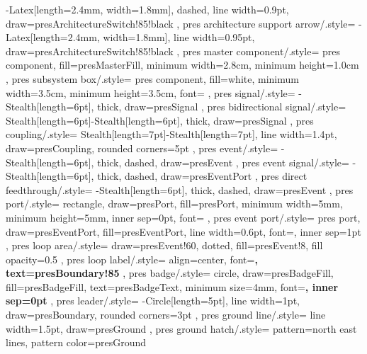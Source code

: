 {{    -{Latex[length=2.4mm, width=1.8mm]},
    dashed,
    line width=0.9pt,
    draw=presArchitectureSwitch!85!black
  },
  pres architecture support arrow/.style={
    -{Latex[length=2.4mm, width=1.8mm]},
    line width=0.95pt,
    draw=presArchitectureSwitch!85!black
  },
  pres master component/.style={
    pres component,
    fill=presMasterFill,
    minimum width=2.8cm,
    minimum height=1.0cm
  },
  pres subsystem box/.style={
    pres component,
    fill=white,
    minimum width=3.5cm,
    minimum height=3.5cm,
    font=\sffamily
  },
  pres signal/.style={
    -{Stealth[length=6pt]},
    thick,
    draw=presSignal
  },
  pres bidirectional signal/.style={
    {Stealth[length=6pt]}-{Stealth[length=6pt]},
    thick,
    draw=presSignal
  },
  pres coupling/.style={
    {Stealth[length=7pt]}-{Stealth[length=7pt]},
    line width=1.4pt,
    draw=presCoupling,
    rounded corners=5pt
  },
  pres event/.style={
    -{Stealth[length=6pt]},
    thick,
    dashed,
    draw=presEvent
  },
  pres event signal/.style={
    -{Stealth[length=6pt]},
    thick,
    dashed,
    draw=presEventPort
  },
  pres direct feedthrough/.style={
    -{Stealth[length=6pt]},
    thick,
    dashed,
    draw=presEvent
  },
  pres port/.style={
    rectangle,
    draw=presPort,
    fill=presPort,
    minimum width=5mm,
    minimum height=5mm,
    inner sep=0pt,
    font=\bfseries\small
  },
  pres event port/.style={
    pres port,
    draw=presEventPort,
    fill=presEventPort,
    line width=0.6pt,
    font=\small\ttfamily,
    inner sep=1pt
  },
  pres loop area/.style={
    draw=presEvent!60,
    dotted,
    fill=presEvent!8,
    fill opacity=0.5
  },
  pres loop label/.style={
    align=center,
    font=\sffamily\footnotesize\bfseries,
    text=presBoundary!85
  },
  pres badge/.style={
    circle,
    draw=presBadgeFill,
    fill=presBadgeFill,
    text=presBadgeText,
    minimum size=4mm,
    font=\sffamily\small\bfseries,
    inner sep=0pt
  },
  pres leader/.style={
    -{Circle[length=5pt]},
    line width=1pt,
    draw=presBoundary,
    rounded corners=3pt
  },
  pres ground line/.style={
    line width=1.5pt,
    draw=presGround
  },
  pres ground hatch/.style={
    pattern=north east lines,
    pattern color=presGround
  }
}

